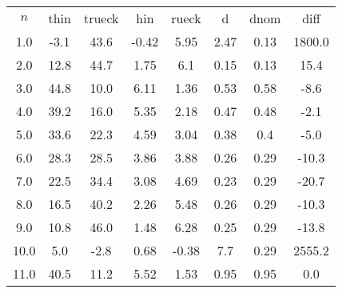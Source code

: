 \begin{table}
\begin{tabular}{cccccccc}
$n$ & thin & trueck & hin & rueck & d & dnom & diff \\
1.0 & -3.1 & 43.6 & -0.42 & 5.95 & 2.47 & 0.13 & 1800.0 \\
2.0 & 12.8 & 44.7 & 1.75 & 6.1 & 0.15 & 0.13 & 15.4 \\
3.0 & 44.8 & 10.0 & 6.11 & 1.36 & 0.53 & 0.58 & -8.6 \\
4.0 & 39.2 & 16.0 & 5.35 & 2.18 & 0.47 & 0.48 & -2.1 \\
5.0 & 33.6 & 22.3 & 4.59 & 3.04 & 0.38 & 0.4 & -5.0 \\
6.0 & 28.3 & 28.5 & 3.86 & 3.88 & 0.26 & 0.29 & -10.3 \\
7.0 & 22.5 & 34.4 & 3.08 & 4.69 & 0.23 & 0.29 & -20.7 \\
8.0 & 16.5 & 40.2 & 2.26 & 5.48 & 0.26 & 0.29 & -10.3 \\
9.0 & 10.8 & 46.0 & 1.48 & 6.28 & 0.25 & 0.29 & -13.8 \\
10.0 & 5.0 & -2.8 & 0.68 & -0.38 & 7.7 & 0.29 & 2555.2 \\
11.0 & 40.5 & 11.2 & 5.52 & 1.53 & 0.95 & 0.95 & 0.0 \\
\end{tabular}
\end{table}
